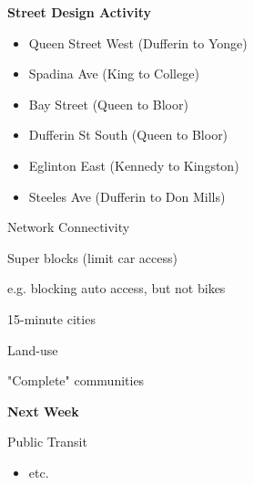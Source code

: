 \documentclass[aspectratio=169]{beamer}
\begin{document}
\begin{frame}
	
	\textbf{Street Design Activity}
	
	\begin{itemize}
		\item Queen Street West (Dufferin to Yonge)
		\item Spadina Ave (King to College)
		\item Bay Street (Queen to Bloor)
		\item Dufferin St South (Queen to Bloor)
		\item Eglinton East (Kennedy to Kingston) 
		\item Steeles Ave (Dufferin to Don Mills)
	\end{itemize}
	
\end{frame}



\begin{frame}
	
	Network Connectivity
	
\end{frame}



\begin{frame}
	
	Super blocks (limit car access)
	
	e.g. blocking auto access, but not bikes
	
\end{frame}



\begin{frame}
	
	15-minute cities
	
	Land-use
	
	"Complete" communities
		
\end{frame}




\begin{frame}
	\textbf{Next Week} 
	
	\vspace{4mm}
	
	Public Transit
	
	\begin{itemize}
				
		
		\item etc.
				
		
	\end{itemize}
	
\end{frame}
\end{document}
